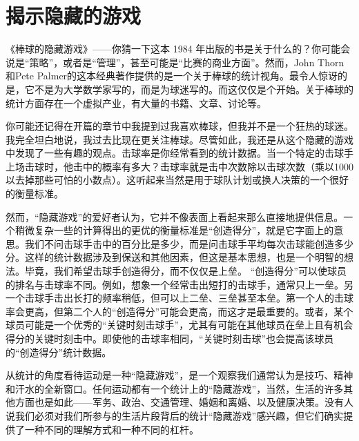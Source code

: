 \chapter{揭示隐藏的游戏}

《棒球的隐藏游戏》——你猜一下这本 1984 年出版的书是关于什么的？你可能会说是“策略”，或者是“管理”，甚至可能是“比赛的商业方面”。然而，John Thorn和Pete Palmer的这本经典著作提供的是一个关于棒球的统计视角。最令人惊讶的是，它不是为大学数学家写的，而是为球迷写的。而这仅仅是个开始。关于棒球的统计方面存在一个虚拟产业，有大量的书籍、文章、讨论等。

你可能还记得在开篇的章节中我提到过我喜欢棒球，但我并不是一个狂热的球迷。我完全坦白地说，我过去比现在更关注棒球。尽管如此，我还是从这个隐藏的游戏中发现了一些有趣的观点。击球率是你经常看到的统计数据。当一个特定的击球手上场击球时，他击中的概率有多大？击球率就是击中次数除以击球次数（乘以1000以去掉那些可怕的小数点）。这听起来当然是用于球队计划或换人决策的一个很好的衡量标准。

然而，“隐藏游戏”的爱好者认为，它并不像表面上看起来那么直接地提供信息。一个稍微复杂一些的计算得出的更优的衡量标准是“创造得分”，就是它字面上的意思。我们不问击球手击中的百分比是多少，而是问击球手平均每次击球能创造多少分。这样的统计数据涉及到保送和其他因素，但这是基本思想，也是一个明智的想法。毕竟，我们希望击球手创造得分，而不仅仅是上垒。
“创造得分”可以使球员的排名与击球率不同。例如，想象一个经常击出短打的击球手，通常只上一垒。另一个击球手击出长打的频率稍低，但可以上二垒、三垒甚至本垒。第一个人的击球率会更高，但第二个人的“创造得分”可能会更高，而这才是最重要的。或者，某个球员可能是一个优秀的“关键时刻击球手”，尤其有可能在其他球员在垒上且有机会得分的关键时刻击中。即使他的击球率相同，“关键时刻击球”也会提高该球员的“创造得分”统计数据。

从统计的角度看待运动是一种“隐藏游戏”，是一个观察我们通常认为是技巧、精神和汗水的全新窗口。任何运动都有一个统计上的“隐藏游戏”，当然，生活的许多其他方面也是如此——军务、政治、交通管理、婚姻和离婚、以及健康决策。没有人说我们必须对我们所参与的生活片段背后的统计“隐藏游戏”感兴趣，但它们确实提供了一种不同的理解方式和一种不同的杠杆。

